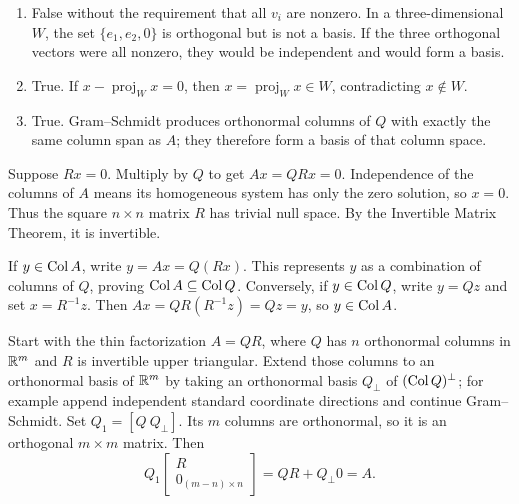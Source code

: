 \begin{enumerate}[label=(\alph*)]
\item False without the requirement that all $v_i$ are nonzero.
In a three-dimensional $W$, the set $\{e_1,e_2,0\}$ is orthogonal
but is not a basis. If the three orthogonal vectors were all nonzero,
they would be independent and would form a basis.
\item True. If $x-\operatorname{proj}_Wx=0$, then
$x=\operatorname{proj}_Wx\in W$, contradicting $x\notin W$.
\item True. Gram--Schmidt produces orthonormal columns of $Q$ with
exactly the same column span as $A$; they therefore form a basis of
that column space.
\end{enumerate}

Suppose $Rx=0$. Multiply by $Q$ to get $Ax=QRx=0$.
Independence of the columns of $A$ means its homogeneous system has
only the zero solution, so $x=0$. Thus the square $n\times n$ matrix
$R$ has trivial null space. By the Invertible Matrix Theorem, it is
invertible.

If $y\in\operatorname{Col} A$, write $y=Ax=Q(Rx)$. This represents $y$ as
a combination of columns of $Q$, proving $\operatorname{Col} A\subseteq\operatorname{Col} Q$.
Conversely, if $y\in\operatorname{Col} Q$, write $y=Qz$ and set $x=R^{-1}z$.
Then $Ax=QR(R^{-1}z)=Qz=y$, so $y\in\operatorname{Col} A$.

Start with the thin factorization $A=QR$, where $Q$ has $n$
orthonormal columns in $\mathbb{R}^m$ and $R$ is invertible upper triangular.
Extend those columns to an orthonormal basis of $\mathbb{R}^m$ by taking an
orthonormal basis $Q_\perp$ of $(\operatorname{Col} Q)^\perp$; for example append
independent standard coordinate directions and continue Gram--Schmidt.
Set $Q_1=[Q\ Q_\perp]$. Its $m$ columns are orthonormal, so it is
an orthogonal $m\times m$ matrix. Then
\[
Q_1\begin{bmatrix}R\\0_{(m-n)\times n}\end{bmatrix}
=QR+Q_\perp0=A.
\]

